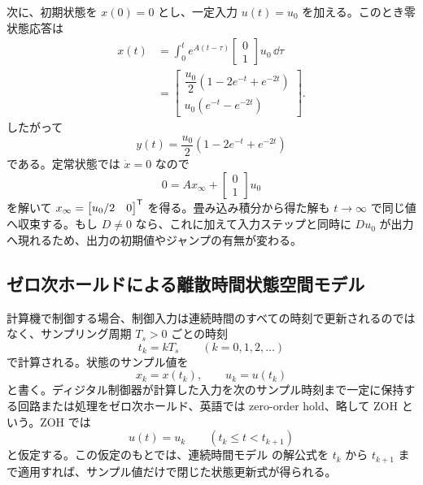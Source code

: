 次に、初期状態を $x(0)=0$ とし、一定入力 $u(t)=u_0$ を加える。このとき零状態応答は
\begin{align}
  x(t)
  &=\int_0^t e^{A(t-\tau)}
    \begin{bmatrix}0\\1\end{bmatrix}u_0\,\dd\tau\\
  &=
  \begin{bmatrix}
    \dfrac{u_0}{2}\left(1-2e^{-t}+e^{-2t}\right)\\
    u_0\left(e^{-t}-e^{-2t}\right)
  \end{bmatrix}.
\end{align}
したがって
\begin{equation}
  y(t)=\frac{u_0}{2}\left(1-2e^{-t}+e^{-2t}\right)
\end{equation}
である。定常状態では $\dot{x}=0$ なので
\begin{equation}
  0=Ax_\infty+
  \begin{bmatrix}0\\1\end{bmatrix}u_0
\end{equation}
を解いて $x_\infty=\begin{bmatrix}u_0/2&0\end{bmatrix}^{\mathsf{T}}$ を得る。畳み込み積分から得た解も $t\to\infty$ で同じ値へ収束する。もし $D\ne0$ なら、これに加えて入力ステップと同時に $Du_0$ が出力へ現れるため、出力の初期値やジャンプの有無が変わる。

\subsection{ゼロ次ホールドによる離散時間状態空間モデル}

計算機で制御する場合、制御入力は連続時間のすべての時刻で更新されるのではなく、サンプリング周期 $T_s>0$ ごとの時刻
\begin{equation}
  t_k=kT_s\qquad(k=0,1,2,\ldots)
\end{equation}
で計算される。状態のサンプル値を
\begin{equation}
  x_k=x(t_k),\qquad u_k=u(t_k)
\end{equation}
と書く。ディジタル制御器が計算した入力を次のサンプル時刻まで一定に保持する回路または処理をゼロ次ホールド、英語では zero-order hold、略して ZOH という。ZOH では
\begin{equation}
  u(t)=u_k\qquad(t_k\le t<t_{k+1})
  \label{eq:zoh-input}
\end{equation}
と仮定する。この仮定のもとでは、連続時間モデル  の解公式を $t_k$ から $t_{k+1}$ まで適用すれば、サンプル値だけで閉じた状態更新式が得られる。


